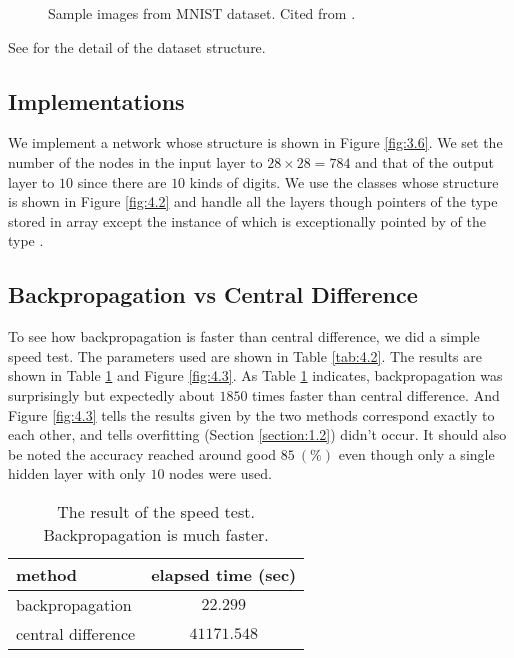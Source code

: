 \documentclass{article}
\theoremstyle{definition}
\newcommand{\sect}[1]{Section \ref{section:#1}}
\newcommand{\fig}[1]{Figure \ref{fig:#1}}
\newcommand{\tab}[1]{Table \ref{tab:#1}}
\begin{document}
\begin{figure}[H]
    \centering
    \begin{subfigure}[H]{1.0\textwidth}
	\end{subfigure}
    \caption{Sample images from MNIST dataset. Cited from \cite{8}.}
    \label{fig:4.1}
\end{figure}

See \href{../read\_mnist/README.md}{} for the detail of the dataset structure.

\subsection{Implementations} \label{section:4.2}

We implement a network whose structure is shown in \fig{3.6}. We set the number of the nodes in the input layer to $28 \times 28 = 784$ and that of the output layer to $10$ since there are $10$ kinds of digits. We use the classes whose structure is shown in \fig{4.2} and handle all the layers though pointers of the type  stored in  array except the instance of  which is exceptionally pointed by  of the type .

\subsection{Backpropagation vs Central Difference}

To see how backpropagation is faster than central difference, we did a simple speed test. The parameters used are shown in \tab{4.2}. The results are shown in \tab{4.1} and \fig{4.3}. As \tab{4.1} indicates, backpropagation was surprisingly but expectedly about $1850$ times faster than central difference. And \fig{4.3} tells the results given by the two methods correspond exactly to each other, and tells overfitting (\sect{1.2}) didn't occur. It should also be noted the accuracy reached around good $85\ (\%)$ even though only a single hidden layer with only $10$ nodes were used.

\begin{table}[H]
    \centering
    \begin{tabular}{|l|c|} \hline
    method & elapsed time (sec) \\ \hline
    backpropagation & $22.299$ \\ \hline
    central difference & $41171.548$ \\ \hline
    \end{tabular}
    \caption{The result of the speed test. Backpropagation is much faster.}
    \label{tab:4.1}
\end{table}
\end{document}
